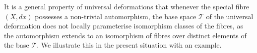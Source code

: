 \documentclass[11pt,twoside]{amsart}
\theoremstyle{plain}
\newcommand{\Tm}{\mathcal{T}}
\newcommand{\dfx}{dx}
\begin{document}

 It is a general property of universal deformations that whenever the special fibre $ (X, \dfx) $ possesses a non-trivial automorphism,
 the base space $\Tm $ of the universal deformation does not locally parameterise isomorphism classes of the fibres,  as the automorphism extends to an isomorphism of fibres over distinct elements of the base $\Tm $. We illustrate this in the present situation with an example.
 
\end{document}
